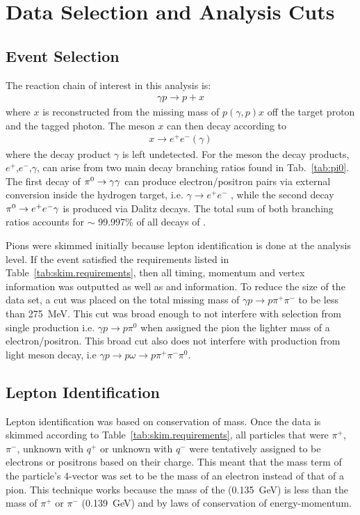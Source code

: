 \section{Data Selection and Analysis Cuts}\label{sec:evnt}
\subsection{Event Selection}\label{subsec:evnt}
	The reaction chain of interest in this analysis is:
	\begin{align}
	\gamma p \rightarrow p + x
	\end{align}
	where $x$ is reconstructed from the missing mass of $p(\gamma,p)x$ off the target proton and the tagged photon. The meson $x$ can then decay according to  
	\begin{align}
	x\rightarrow e^{+}e^{-}(\gamma)
	\end{align}
	where the decay product $\gamma$ is left undetected. For the \pizT meson the decay products, $e^+$,$e^-$,$\gamma$, can arise from two main decay branching ratios found in Tab.~\ref{tab:pi0}. The first decay of $\pi^{0}\rightarrow\gamma\gamma$ can produce electron/positron pairs via external conversion inside the hydrogen target, i.e. $\gamma\rightarrow e^+e^-$ , while the second decay $\pi^{0}\rightarrow e^+e^-\gamma$ is produced via Dalitz decays. The total sum of both branching ratios accounts for $\sim$ 99.997\% of all decays of \pizT.
	
	\FloatBarrier
	Pions were skimmed initially because lepton identification is done at the analysis level. If the event satisfied the requirements listed in Table~\ref{tab:skim.requirements}, then all timing, momentum and vertex information was 
	outputted as well as  and  information. To reduce the size of the data set, a cut 
	was placed on the total missing mass of $\gamma p \to p \pi^{+} \pi^{-}$ to be less than 275~MeV. This cut was broad enough to not interfere with \pizT selection from single 
	\pizT production i.e. $\gamma p \to p \pi^{0}$ when assigned the pion the lighter mass of a electron/positron. This broad cut also does not interfere with \pizT production from 
	light meson decay, i.e $\gamma p \to p \omega \to p \pi^{+} \pi^{-} \pi^{0}$. 
		
	
	\FloatBarrier
\subsection{Lepton Identification}
	Lepton identification was based on conservation of mass. Once the data is skimmed according to Table~\ref{tab:skim.requirements}, all particles that were $\pi^+$, $\pi^-$, unknown with $q^+$ or unknown with $q^-$ were tentatively assigned to be electrons or positrons based on their charge. This meant that the mass term of the particle's 4-vector was set to be the mass of an electron instead of that of a pion. This technique works because the mass of the \pizT (0.135~GeV) is less than the mass of $\pi^+$ or $\pi^-$ (0.139~GeV) and by laws of conservation of energy-momentum.
	
